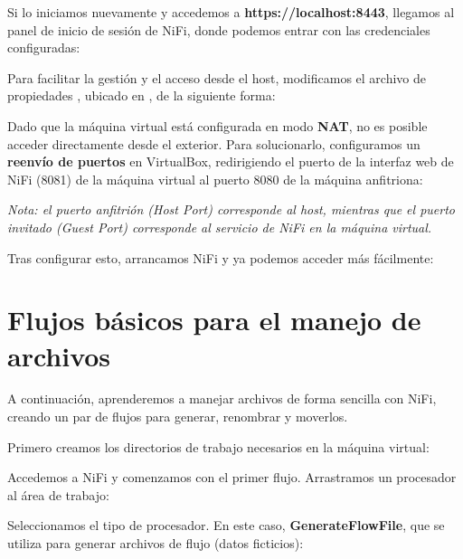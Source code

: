 \documentclass{../../miPlantilla}
\begin{document}
Si lo iniciamos nuevamente y accedemos a \textbf{https://localhost:8443}, llegamos al panel de inicio de sesión de NiFi, donde podemos entrar con las credenciales configuradas:


\newpage

Para facilitar la gestión y el acceso desde el host, modificamos el archivo de propiedades , ubicado en , de la siguiente forma:


Dado que la máquina virtual está configurada en modo \textbf{NAT}, no es posible acceder directamente desde el exterior. Para solucionarlo, configuramos un \textbf{reenvío de puertos} en VirtualBox, redirigiendo el puerto de la interfaz web de NiFi (8081) de la máquina virtual al puerto 8080 de la máquina anfitriona:


\textit{Nota: el puerto anfitrión (\textit{Host Port}) corresponde al host, mientras que el puerto invitado (\textit{Guest Port}) corresponde al servicio de NiFi en la máquina virtual.}

\newpage

Tras configurar esto, arrancamos NiFi y ya podemos acceder más fácilmente:


\newpage

\section{Flujos básicos para el manejo de archivos}
A continuación, aprenderemos a manejar archivos de forma sencilla con NiFi, creando un par de flujos para generar, renombrar y moverlos.

Primero creamos los directorios de trabajo necesarios en la máquina virtual:


Accedemos a NiFi y comenzamos con el primer flujo. Arrastramos un procesador al área de trabajo:


Seleccionamos el tipo de procesador. En este caso, \textbf{GenerateFlowFile}, que se utiliza para generar archivos de flujo (datos ficticios):
\end{document}
